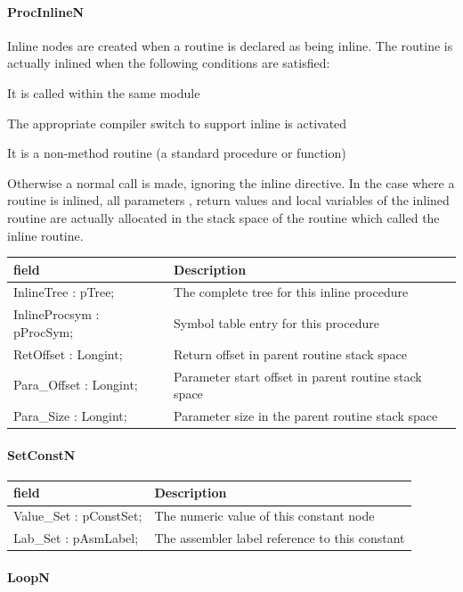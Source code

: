 \documentclass [a4paper,12pt]{article}
\begin{document}
\paragraph{ProcInlineN}\mbox{}

Inline nodes are created when a routine is declared as being inline. The
routine is actually inlined when the following conditions are satisfied:

It is called within the same module

The appropriate compiler switch to support inline is activated

It is a non-method routine (a standard procedure or function)

Otherwise a normal call is made, ignoring the inline directive. In the case
where a routine is inlined, all parameters , return values and local
variables of the inlined routine are actually allocated in the stack space
of the routine which called the inline routine.

\begin{longtable}{|l|p{10cm}|}
\hline
field	& Description \\
\hline
\endhead
\hline
\endfoot
\textsf{InlineTree : pTree;}&
	The complete tree for this inline procedure \\
\textsf{InlineProcsym : pProcSym;}&
	Symbol table entry for this procedure \\
\textsf{RetOffset : Longint;}&
	Return offset in parent routine stack space \\
\textsf{Para{\_}Offset : Longint;}&
	Parameter start offset in parent routine stack space \\
\textsf{Para{\_}Size : Longint;}&
	Parameter size in the parent routine stack space
\label{tab26}
\end{longtable}

\paragraph{SetConstN}\mbox{}

\begin{longtable}{|l|p{10cm}|}
\hline
field	& Description \\
\hline
\endhead
\hline
\endfoot
\textsf{Value{\_}Set : pConstSet;}& The numeric value of this constant node \\
\textsf{Lab{\_}Set : pAsmLabel;}  & The assembler label reference to this constant
\label{tab27}
\end{longtable}

\paragraph{LoopN}\mbox{}
\end{document}
